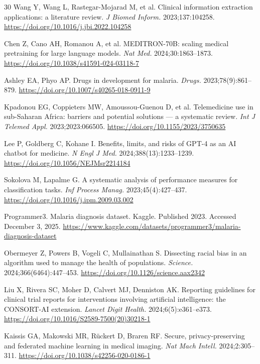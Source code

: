 \documentclass[12pt,a4paper]{article}
\begin{document}
\begin{thebibliography}{30}
Wang Y, Wang L, Rastegar-Mojarad M, et al. Clinical information extraction applications: a literature review. \textit{J Biomed Inform.} 2023;137:104258. \url{https://doi.org/10.1016/j.jbi.2022.104258}

Chen Z, Cano AH, Romanou A, et al. MEDITRON-70B: scaling medical pretraining for large language models. \textit{Nat Med.} 2024;30:1863--1873. \url{https://doi.org/10.1038/s41591-024-03118-7}

Ashley EA, Phyo AP. Drugs in development for malaria. \textit{Drugs.} 2023;78(9):861--879. \url{https://doi.org/10.1007/s40265-018-0911-9}

Kpadonou EG, Coppieters MW, Amoussou-Guenou D, et al. Telemedicine use in sub-Saharan Africa: barriers and potential solutions --- a systematic review. \textit{Int J Telemed Appl.} 2023;2023:066505. \url{https://doi.org/10.1155/2023/3750635}

Lee P, Goldberg C, Kohane I. Benefits, limits, and risks of GPT-4 as an AI chatbot for medicine. \textit{N Engl J Med.} 2024;388(13):1233--1239. \url{https://doi.org/10.1056/NEJMsr2214184}

Sokolova M, Lapalme G. A systematic analysis of performance measures for classification tasks. \textit{Inf Process Manag.} 2023;45(4):427--437. \url{https://doi.org/10.1016/j.ipm.2009.03.002}

Programmer3. Malaria diagnosis dataset. Kaggle. Published 2023. Accessed December 3, 2025. \url{https://www.kaggle.com/datasets/programmer3/malaria-diagnosis-dataset}

Obermeyer Z, Powers B, Vogeli C, Mullainathan S. Dissecting racial bias in an algorithm used to manage the health of populations. \textit{Science.} 2024;366(6464):447--453. \url{https://doi.org/10.1126/science.aax2342}

Liu X, Rivera SC, Moher D, Calvert MJ, Denniston AK. Reporting guidelines for clinical trial reports for interventions involving artificial intelligence: the CONSORT-AI extension. \textit{Lancet Digit Health.} 2024;6(5):e361--e373. \url{https://doi.org/10.1016/S2589-7500(20)30218-1}

Kaissis GA, Makowski MR, R\"{u}ckert D, Braren RF. Secure, privacy-preserving and federated machine learning in medical imaging. \textit{Nat Mach Intell.} 2024;2:305--311. \url{https://doi.org/10.1038/s42256-020-0186-1}

\end{thebibliography}
\end{document}
